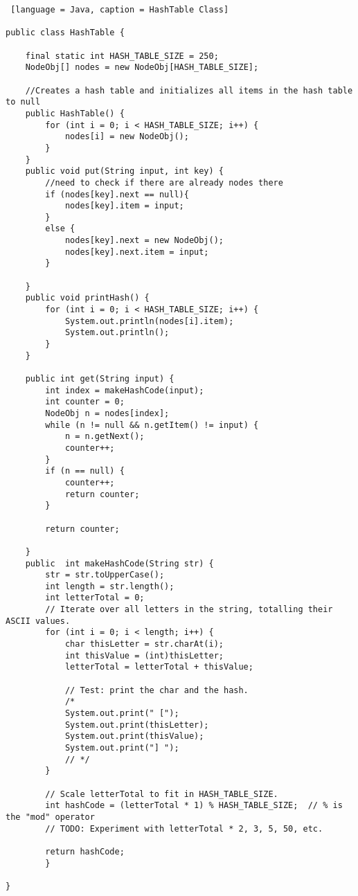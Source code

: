 \documentclass{article}
\begin{document}
\begin{lstlisting} [language = Java, caption = HashTable Class]

public class HashTable {

    final static int HASH_TABLE_SIZE = 250;
    NodeObj[] nodes = new NodeObj[HASH_TABLE_SIZE];

    //Creates a hash table and initializes all items in the hash table to null
    public HashTable() {
        for (int i = 0; i < HASH_TABLE_SIZE; i++) {
            nodes[i] = new NodeObj();
        }
    }
    public void put(String input, int key) {
        //need to check if there are already nodes there
        if (nodes[key].next == null){
            nodes[key].item = input;
        }
        else {
            nodes[key].next = new NodeObj();
            nodes[key].next.item = input;
        }
    
    }
    public void printHash() {
        for (int i = 0; i < HASH_TABLE_SIZE; i++) {
            System.out.println(nodes[i].item);
            System.out.println();
        }
    }

    public int get(String input) {
        int index = makeHashCode(input);
        int counter = 0;
        NodeObj n = nodes[index];
        while (n != null && n.getItem() != input) {
            n = n.getNext();
            counter++;
        }    
        if (n == null) {
            counter++;
            return counter;
        }   
        
        return counter;

    }
    public  int makeHashCode(String str) {
        str = str.toUpperCase();
        int length = str.length();
        int letterTotal = 0;
        // Iterate over all letters in the string, totalling their ASCII values.
        for (int i = 0; i < length; i++) {
            char thisLetter = str.charAt(i);
            int thisValue = (int)thisLetter;
            letterTotal = letterTotal + thisValue;

            // Test: print the char and the hash.
            /* 
            System.out.print(" ["); 
            System.out.print(thisLetter); 
            System.out.print(thisValue); 
            System.out.print("] "); 
            // */
        }
        
        // Scale letterTotal to fit in HASH_TABLE_SIZE.
        int hashCode = (letterTotal * 1) % HASH_TABLE_SIZE;  // % is the "mod" operator
        // TODO: Experiment with letterTotal * 2, 3, 5, 50, etc.
           
        return hashCode;
        }

}
\end{lstlisting}
\end{document}
